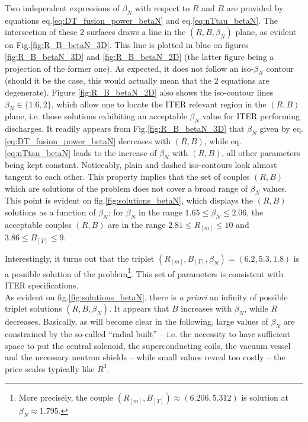Two independent expressions of $\beta_N$ with respect to $R$ and $B$ are provided by equations eq.\ref{eq:DT_fusion_power_betaN} and eq.\ref{eq:nTtau_betaN}. The intersection of these 2 surfaces draws a line in the $(R,B,\beta_N)$ plane, as evident on Fig.\ref{fig:R_B_betaN_3D}. This line is plotted in blue on figures \ref{fig:R_B_betaN_3D} and \ref{fig:R_B_betaN_2D} (the latter figure being a projection of the former one). As expected, it does not follow an iso-$\beta_N$ contour (should it be the case, this would actually mean that the 2 equations are degenerate). Figure \ref{fig:R_B_betaN_2D} also shows the iso-contour lines $\beta_N \in \{1.6, 2\}$, which allow one to locate the ITER relevant region in the $(R,B)$ plane, i.e. those solutions exhibiting an acceptable $\beta_N$ value for ITER performing discharges. 
It readily appears from Fig.\ref{fig:R_B_betaN_3D} that $\beta_N$ given by eq.\ref{eq:DT_fusion_power_betaN} decreases with $(R,B)$, while eq.\ref{eq:nTtau_betaN} leads to the increase of $\beta_N$ with $(R,B)$, all other parameters being kept constant.
Noticeably, plain and dashed iso-contours look almost tangent to each other. This property implies that the set of couples $(R,B)$ which are solutions of the problem does not cover a broad range of $\beta_N$ values. This point is evident on fig.\ref{fig:solutions_betaN}, which displays the $(R,B)$ solutions as a function of $\beta_N$: for $\beta_N$ in the range $1.65 \leq \beta_N \leq 2.06$, the acceptable couples $(R,B)$ are in the range $2.81 \leq R_{[m]} \leq 10$ and $3.86 \leq B_{[T]} \leq 9$.

Interestingly, it turns out that the triplet $(R_{[m]},B_{[T]},\beta_N) = (6.2, 5.3, 1.8)$ is a possible solution of the problem\footnote{More precisely, the couple $(R_{[m]},B_{[T]}) \approx (6.206, 5.312)$ is solution at $\beta_N \approx 1.795$.}. This set of parameters is consistent with ITER specifications. \\

As evident on fig.\ref{fig:solutions_betaN}, there is \emph{a priori} an infinity of possible triplet solutions $(R,B,\beta_N)$. It appears that $B$ increases with $\beta_N$, while $R$ decreases. Basically, as will become clear in the following, large values of  $\beta_N$ are constrained by the so-called ``radial built'' -- i.e. the necessity to have sufficient space to put the central solenoid, the superconducting coils, the vacuum vessel and the necessary neutron shields -- while small values reveal too costly -- the price scales typically like $R^3$.


